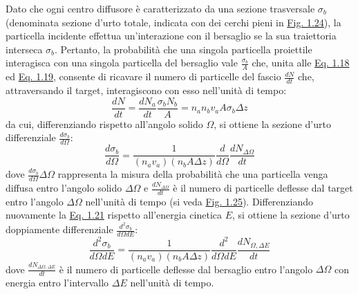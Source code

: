 \documentclass[12pt,a4paper,twoside]{report}
\begin{document}
	Dato che ogni centro diffusore è caratterizzato da una sezione trasversale $\sigma_b$ (denominata sezione d'urto totale, indicata con dei cerchi pieni in \hyperref[fig:scattering]{Fig. 1.24}), la particella incidente effettua un'interazione con il bersaglio se la sua traiettoria interseca $\sigma_b$. Pertanto, la probabilità che una singola particella proiettile interagisca con una singola particella del bersaglio vale $\frac{\sigma_b}{A}$ che, unita alle \hyperref[eq:scattering1]{Eq. 1.18} ed \hyperref[eq:scattering2]{Eq. 1.19}, consente di ricavare il numero di particelle del fascio $\frac{dN}{dt}$ che, attraversando il target, interagiscono con esso nell'unità di tempo:
	\begin{equation}
		\frac{dN}{dt}=\frac{dN_a}{dt}\frac{\sigma_bN_b}{A}=n_an_bv_aA\sigma_b\Delta z
		\label{eq:scattering3}
	\end{equation}
	da cui, differenziando rispetto all'angolo solido $\Omega$, si ottiene la sezione d'urto differenziale $\frac{d\sigma_b}{d\Omega}$:
	\begin{equation}
		\frac{d\sigma_b}{d\Omega}=\frac{1}{\left(n_av_a\right)\left(n_bA\Delta z\right)}\frac{d}{d\Omega}\frac{dN_{\Delta\Omega}}{dt}
		\label{eq:scattering4}
	\end{equation}
	dove $\frac{d\sigma_b}{d\Omega}\Delta \Omega$ rappresenta la misura della probabilità che una particella venga diffusa entro l'angolo solido $\Delta \Omega$ e $\frac{dN_{\Delta\Omega}}{dt}$ è il numero di particelle deflesse dal target entro l'angolo $\Delta \Omega$ nell'unità di tempo (si veda \hyperref[fig:solid_angle]{Fig. 1.25}). Differenziando nuovamente la \hyperref[eq:scattering4]{Eq. 1.21} rispetto all'energia cinetica $E$, si ottiene la sezione d'urto doppiamente differenziale $\frac{d^2\sigma_b}{d\Omega dE}$:
	\begin{equation}
		\frac{d^2\sigma_b}{d\Omega dE}=\frac{1}{\left(n_av_a\right)\left(n_bA\Delta z\right)}\frac{d^2}{d\Omega dE}\frac{dN_{\Omega,\Delta E}}{dt}
		\label{eq:scattering5}
	\end{equation}
	dove $\frac{dN_{\Delta\Omega,\Delta E}}{dt}$ è il numero di particelle deflesse dal bersaglio entro l'angolo $\Delta \Omega$ con energia entro l'intervallo $\Delta E$ nell'unità di tempo.
\end{document}
